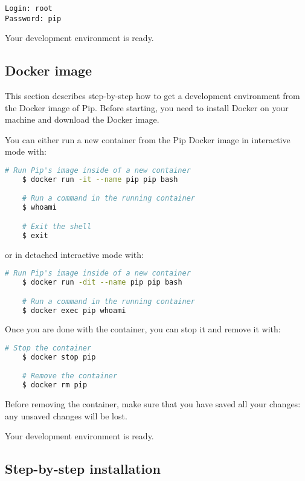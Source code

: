 \documentclass[10pt,a4paper,titlepage]{refart}
\begin{document}
\begin{lstlisting}
Login: root
Password: pip
\end{lstlisting}

Your development environment is ready.

\subsection{Docker image}

This section describes step-by-step how to get a development environment from
the Docker image of Pip. Before starting, you need to install Docker on your
machine and download the Docker image.

You can either run a new container from the Pip Docker image in interactive
mode with:

\begin{lstlisting}[language=bash]
    # Run Pip's image inside of a new container
    $ docker run -it --name pip pip bash

    # Run a command in the running container
    $ whoami

    # Exit the shell
    $ exit
\end{lstlisting}

or in detached interactive mode with:

\begin{lstlisting}[language=bash]
    # Run Pip's image inside of a new container
    $ docker run -dit --name pip pip bash

    # Run a command in the running container
    $ docker exec pip whoami
\end{lstlisting}

Once you are done with the container, you can stop it and remove it with:

\begin{lstlisting}[language=bash]
    # Stop the container
    $ docker stop pip

    # Remove the container
    $ docker rm pip
\end{lstlisting}

Before removing the container, make sure that you have saved all your changes:
any unsaved changes will be lost.

Your development environment is ready.

\subsection{Step-by-step installation}
\end{document}
